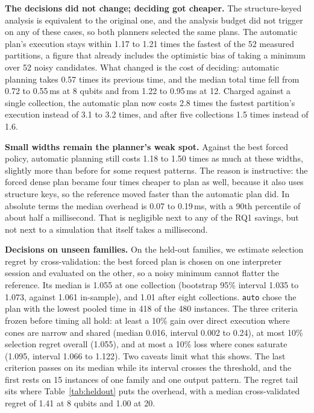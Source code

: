 \textbf{The decisions did not change; deciding got cheaper.} The structure-keyed analysis is equivalent to the original one, and the analysis budget did not trigger on any of these cases, so both planners selected the same plans. The automatic plan's execution stays within 1.17 to 1.21 times the fastest of the 52 measured partitions, a figure that already includes the optimistic bias of taking a minimum over 52 noisy candidates. What changed is the cost of deciding: automatic planning takes 0.57 times its previous time, and the median total time fell from 0.72 to 0.55\,ms at 8 qubits and from 1.22 to 0.95\,ms at 12. Charged against a single collection, the automatic plan now costs 2.8 times the fastest partition's execution instead of 3.1 to 3.2 times, and after five collections 1.5 times instead of 1.6.

\textbf{Small widths remain the planner's weak spot.} Against the best forced policy, automatic planning still costs 1.18 to 1.50 times as much at these widths, slightly more than before for some request patterns. The reason is instructive: the forced dense plan became four times cheaper to plan as well, because it also uses structure keys, so the reference moved faster than the automatic plan did. In absolute terms the median overhead is 0.07 to 0.19\,ms, with a 90th percentile of about half a millisecond. That is negligible next to any of the RQ1 savings, but not next to a simulation that itself takes a millisecond.

\begin{table}[!t]
\caption{Exhaustive Reference: Automatic Plan Relative to the Fastest of the 52 Partitions and the Dense Plan, Geometric Means. Execution Regret Is the Product of Ranking Regret, against the Best Candidate the Planner Generated, and Coverage Regret, of that Candidate against the Best Partition.}
\label{tab:regret}
\centering
\setlength{\tabcolsep}{3pt}
\footnotesize
\resizebox{\columnwidth}{!}{}
\end{table}

\textbf{Decisions on unseen families.} On the held-out families, we estimate selection regret by cross-validation: the best forced plan is chosen on one interpreter session and evaluated on the other, so a noisy minimum cannot flatter the reference. Its median is 1.055 at one collection (bootstrap 95\% interval 1.035 to 1.073, against 1.061 in-sample), and 1.01 after eight collections. \texttt{auto} chose the plan with the lowest pooled time in 418 of the 480 instances. The three criteria frozen before timing all hold: at least a 10\% gain over direct execution where cones are narrow and shared (median 0.016, interval 0.002 to 0.24), at most 10\% selection regret overall (1.055), and at most a 10\% loss where cones saturate (1.095, interval 1.066 to 1.122). Two caveats limit what this shows. The last criterion passes on its median while its interval crosses the threshold, and the first rests on 15 instances of one family and one output pattern. The regret tail sits where Table~\ref{tab:heldout} puts the overhead, with a median cross-validated regret of 1.41 at 8 qubits and 1.00 at 20.

